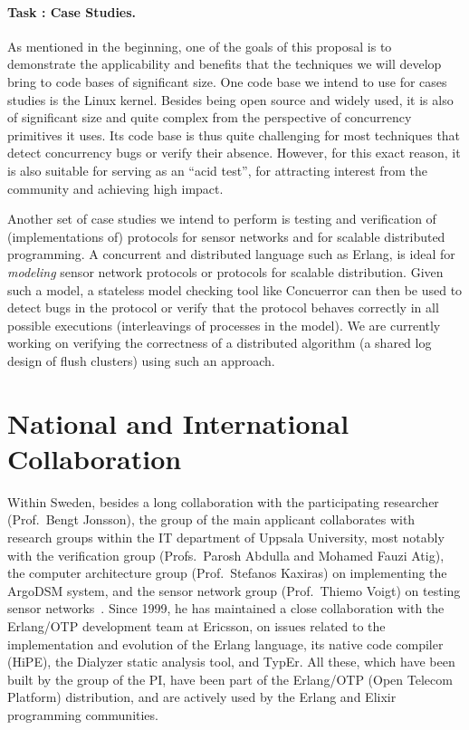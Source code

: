 \documentclass[11pt]{article}
\newcommand{\system}[1]{\mbox{\textsf{#1}}}
\newcounter{Task}
\newcommand{\task}[1]{\addtocounter{Task}{1}\paragraph{Task \theTask: #1}}
\newcommand{\myparagraph}{}
\let\myparagraph=\paragraph
\renewcommand{\paragraph}{\vspace{-3mm}\myparagraph}
\begin{document}
{\task{Case Studies.}
As mentioned in the beginning, one of the goals of this proposal is to
demonstrate the applicability and benefits that the techniques we will
develop bring to code bases of significant size.  One code base we intend
to use for cases studies is the Linux kernel.  Besides being open source
and widely used, it is also of significant size and quite complex from the
perspective of concurrency primitives it uses.  Its code base is thus quite
challenging for most techniques that detect concurrency bugs or verify
their absence.  However, for this exact reason, it is also suitable for
serving as an ``acid test'', for attracting interest from the community and
achieving high impact.

Another set of case studies we intend to perform is testing and
verification of (implementations of) protocols for sensor networks and for
scalable distributed programming.  A concurrent and distributed language
such as Erlang, is ideal for \emph{modeling} sensor network protocols or
protocols for scalable distribution.  Given such a model, a stateless model
checking tool like \system{Concuerror} can then be used to detect bugs in
the protocol or verify that the protocol behaves correctly in all possible
executions (interleavings of processes in the model).  We are currently
working on verifying the correctness of a distributed algorithm (a shared
log design of flush clusters) using such an approach.
}


\section{National and International Collaboration}
Within Sweden, besides a long collaboration with the participating researcher
(Prof.~Bengt Jonsson), the group of the main applicant collaborates with
research groups within the IT department of Uppsala University, most notably
with the verification group (Profs.~Parosh Abdulla and Mohamed Fauzi Atig),
the computer architecture group (Prof.~Stefanos Kaxiras) on implementing the
ArgoDSM system, and the sensor network group (Prof.~Thiemo Voigt) on testing
sensor networks~\cite{PBT@SECON-15}.
%
Since 1999, he has maintained a close collaboration with the
\system{Erlang/OTP} development team at Ericsson, on issues related to the
implementation and evolution of the Erlang language, its native code compiler
(\system{HiPE}), the \system{Dialyzer} static analysis tool, and
\system{TypEr}. All these, which have been built by the group of the PI, have
been part of the Erlang/OTP (Open Telecom Platform) distribution, and are
actively used by the Erlang and Elixir programming communities.
\end{document}
